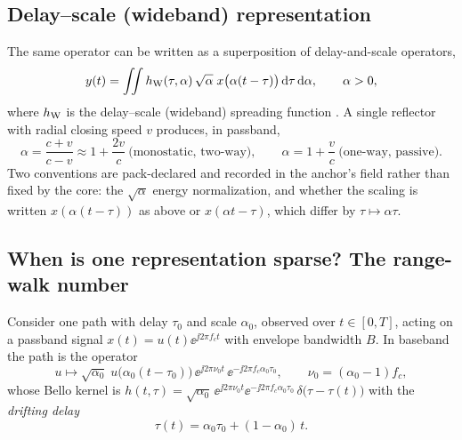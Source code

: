 \subsection[Delay--scale (wideband) representation]{Delay--scale (wideband) representation\hfill{\normalfont\small \tagP{}}}

The same operator can be written as a superposition of delay-and-scale operators,
\begin{equation}
  y(t) = \iint h_{\mathrm{W}}(\tau,\alpha)\,\sqrt{\alpha}\; x\big(\alpha (t-\tau)\big)\,\mathrm{d}\tau\,\mathrm{d}\alpha ,
  \qquad \alpha>0,
  \label{eq:ds}
\end{equation}
where $h_{\mathrm{W}}$ is the delay--scale (wideband) spreading function \citep{altes1973,chude2011}. A single reflector with radial closing speed $v$ produces, in passband,
\begin{equation}
  \alpha = \frac{c+v}{c-v}\approx 1+\frac{2v}{c} \ \text{(monostatic, two-way)},\qquad
  \alpha = 1+\frac{v}{c} \ \text{(one-way, passive)} .
  \label{eq:alpha}
\end{equation}
Two conventions are pack-declared and recorded in the anchor's  field rather than fixed by the core: the $\sqrt{\alpha}$ energy normalization, and whether the scaling is written $x(\alpha(t-\tau))$ as above or $x(\alpha t-\tau)$, which differ by $\tau\mapsto\alpha\tau$.

\subsection{When is one representation sparse? The range-walk number}

Consider one path with delay $\tau_0$ and scale $\alpha_0$, observed over $t\in[0,T]$, acting on a passband signal $x(t)=u(t)\ee^{\jj2\pi f_c t}$ with envelope bandwidth $B$. In baseband the path is the operator
\begin{equation}
  u \mapsto \sqrt{\alpha_0}\;u\big(\alpha_0(t-\tau_0)\big)\,\ee^{\jj 2\pi \nu_0 t}\,\ee^{-\jj 2\pi f_c\alpha_0\tau_0},
  \qquad \nu_0 = (\alpha_0-1) f_c ,
  \label{eq:pathop}
\end{equation}
whose Bello kernel is $h(t,\tau)=\sqrt{\alpha_0}\,\ee^{\jj2\pi\nu_0 t}\ee^{-\jj2\pi f_c\alpha_0\tau_0}\,\delta\big(\tau-\tau(t)\big)$ with the \emph{drifting delay}
\begin{equation}
  \tau(t) = \alpha_0\tau_0 + (1-\alpha_0)\,t .
  \label{eq:drift}
\end{equation}

